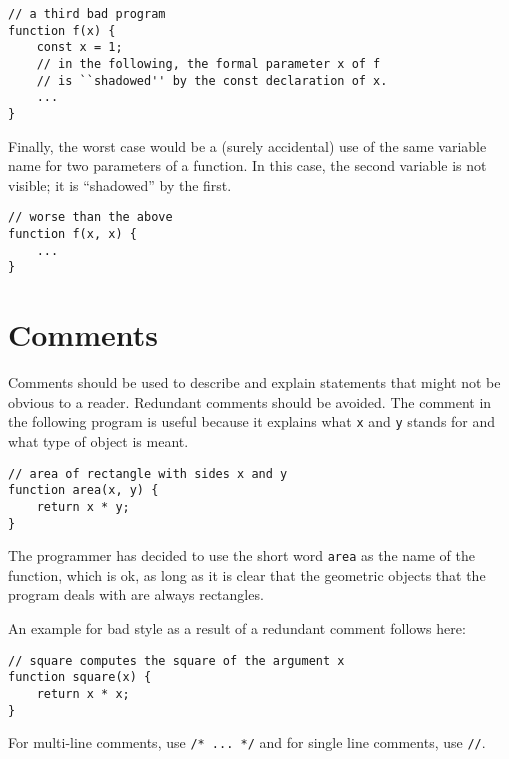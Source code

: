 \begin{lstlisting}
// a third bad program
function f(x) {
    const x = 1;
    // in the following, the formal parameter x of f
    // is ``shadowed'' by the const declaration of x.
    ...
}
\end{lstlisting}
Finally, the worst case would be a (surely accidental) 
use of the same variable name for two parameters of a function.
In this case, the second variable is not visible; it is ``shadowed''
by the first.
\begin{lstlisting}
// worse than the above
function f(x, x) {
    ...
}
\end{lstlisting}

\section*{Comments}
Comments should be used to describe and explain statements 
that might not be obvious to a reader.
Redundant comments should be avoided. The comment in the following program is useful
because it explains what \lstinline{x} and \lstinline{y} stands for and what type of
object is meant. 
\begin{lstlisting}
// area of rectangle with sides x and y
function area(x, y) {
    return x * y;
}
\end{lstlisting}
The programmer has decided to use the short word \lstinline{area} as the name of the function,
which is ok, as long as it is clear that the geometric objects that the program deals with
are always rectangles.

An example for bad style as a result of a redundant comment follows here:
\begin{lstlisting}
// square computes the square of the argument x
function square(x) {
    return x * x;
}
\end{lstlisting}
%
For multi-line comments, use \lstinline{/* ... */} and for single line comments, use \lstinline{//}.



      
